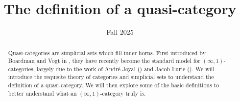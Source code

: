 \documentclass[11pt, letterpaper]{article}
\title{The definition of a quasi-category}
\date{Fall 2025}
\begin{document}
\maketitle

\begin{abstract}
	Quasi-categories are simplicial sets which fill inner horns. First introduced by Boardman and Vogt in \cite{BV73}, they have recently become the standard model for $(\infty, 1)$-categories, largely due to the work of Andr\'e Joyal (\cite{joyal1,joyal2}) and Jacob Lurie (\cite{htt, kerodon}). We will introduce the requisite theory of categories and simplicial sets to understand the definition of a quasi-category. We will then explore some of the basic definitions to better understand what an $(\infty ,1)$-category truly is.
\end{abstract}


\tableofcontents

\newpage









\end{document}
